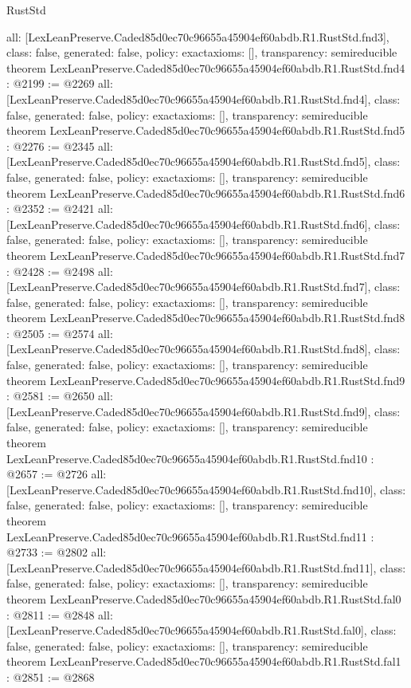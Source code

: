 \begin{lexlean}{RustStd}
\begin{coremodule}
{  all: [LexLeanPreserve.Caded85d0ec70c96655a45904ef60abdb.R1.RustStd.fnd3],
  class: false,
  generated: false,
  policy: exact{axioms: []},
  transparency: semireducible
}
theorem LexLeanPreserve.Caded85d0ec70c96655a45904ef60abdb.R1.RustStd.fnd4 : @2199 := @2269 {
  all: [LexLeanPreserve.Caded85d0ec70c96655a45904ef60abdb.R1.RustStd.fnd4],
  class: false,
  generated: false,
  policy: exact{axioms: []},
  transparency: semireducible
}
theorem LexLeanPreserve.Caded85d0ec70c96655a45904ef60abdb.R1.RustStd.fnd5 : @2276 := @2345 {
  all: [LexLeanPreserve.Caded85d0ec70c96655a45904ef60abdb.R1.RustStd.fnd5],
  class: false,
  generated: false,
  policy: exact{axioms: []},
  transparency: semireducible
}
theorem LexLeanPreserve.Caded85d0ec70c96655a45904ef60abdb.R1.RustStd.fnd6 : @2352 := @2421 {
  all: [LexLeanPreserve.Caded85d0ec70c96655a45904ef60abdb.R1.RustStd.fnd6],
  class: false,
  generated: false,
  policy: exact{axioms: []},
  transparency: semireducible
}
theorem LexLeanPreserve.Caded85d0ec70c96655a45904ef60abdb.R1.RustStd.fnd7 : @2428 := @2498 {
  all: [LexLeanPreserve.Caded85d0ec70c96655a45904ef60abdb.R1.RustStd.fnd7],
  class: false,
  generated: false,
  policy: exact{axioms: []},
  transparency: semireducible
}
theorem LexLeanPreserve.Caded85d0ec70c96655a45904ef60abdb.R1.RustStd.fnd8 : @2505 := @2574 {
  all: [LexLeanPreserve.Caded85d0ec70c96655a45904ef60abdb.R1.RustStd.fnd8],
  class: false,
  generated: false,
  policy: exact{axioms: []},
  transparency: semireducible
}
theorem LexLeanPreserve.Caded85d0ec70c96655a45904ef60abdb.R1.RustStd.fnd9 : @2581 := @2650 {
  all: [LexLeanPreserve.Caded85d0ec70c96655a45904ef60abdb.R1.RustStd.fnd9],
  class: false,
  generated: false,
  policy: exact{axioms: []},
  transparency: semireducible
}
theorem LexLeanPreserve.Caded85d0ec70c96655a45904ef60abdb.R1.RustStd.fnd10 : @2657 := @2726 {
  all: [LexLeanPreserve.Caded85d0ec70c96655a45904ef60abdb.R1.RustStd.fnd10],
  class: false,
  generated: false,
  policy: exact{axioms: []},
  transparency: semireducible
}
theorem LexLeanPreserve.Caded85d0ec70c96655a45904ef60abdb.R1.RustStd.fnd11 : @2733 := @2802 {
  all: [LexLeanPreserve.Caded85d0ec70c96655a45904ef60abdb.R1.RustStd.fnd11],
  class: false,
  generated: false,
  policy: exact{axioms: []},
  transparency: semireducible
}
theorem LexLeanPreserve.Caded85d0ec70c96655a45904ef60abdb.R1.RustStd.fal0 : @2811 := @2848 {
  all: [LexLeanPreserve.Caded85d0ec70c96655a45904ef60abdb.R1.RustStd.fal0],
  class: false,
  generated: false,
  policy: exact{axioms: []},
  transparency: semireducible
}
theorem LexLeanPreserve.Caded85d0ec70c96655a45904ef60abdb.R1.RustStd.fal1 : @2851 := @2868 {
}
\end{coremodule}
\end{lexlean}
